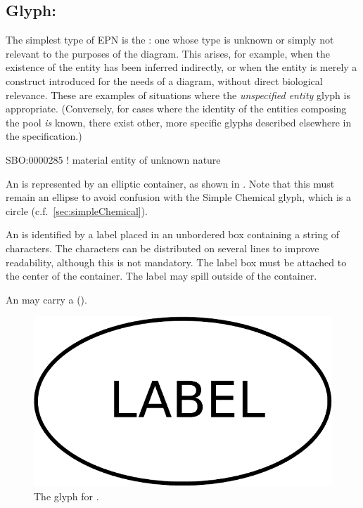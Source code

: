 
\subsection{Glyph: }
\label{sec:unspecifiedEntity}

The simplest type of EPN is the : one whose type is unknown or simply not relevant to the purposes of the diagram.  This arises, for example, when the existence of the entity has been inferred indirectly, or when the entity is merely a construct introduced for the needs of a diagram, without direct biological relevance.  These are examples of situations where the \emph{unspecified entity} glyph is appropriate.  (Conversely, for cases where the identity of the entities composing the pool \emph{is} known, there exist other, more specific glyphs described elsewhere in the specification.)

\begin{glyphDescription}

\glyphSboTerm SBO:0000285 ! material entity of unknown nature 

\glyphContainer An  is represented by an
elliptic container, as shown in .  Note that this
must remain an ellipse to avoid confusion with the Simple Chemical
glyph, which is a circle (c.f.\, \ref{sec:simpleChemical}).

\glyphLabel An  is identified by a label
placed in an unbordered box containing a string of characters.  The
characters can be distributed on several lines to improve readability,
although this is not mandatory.  The label box must be attached to the
center of the container.  The label may spill outside of the
container.

\glyphAux An  may carry a  ().

\end{glyphDescription}

\begin{figure}[H]
  \centering
  \includegraphics[scale = 0.3]{images/unspecified}
  \caption{The \PD glyph for .}
  \label{fig:unspecified}
\end{figure}

